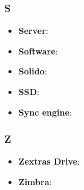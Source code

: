 \subsubsection{S}
\begin{itemize}
	\item \textbf{Server}:
	\item \textbf{Software}: 
	\item \textbf{Solido}:
	\item \textbf{SSD}:
	\item \textbf{Sync engine}:
\end{itemize}

\subsubsection{Z}
\begin{itemize}
	\item \textbf{Zextras Drive}:
	\item \textbf{Zimbra}:
\end{itemize}
